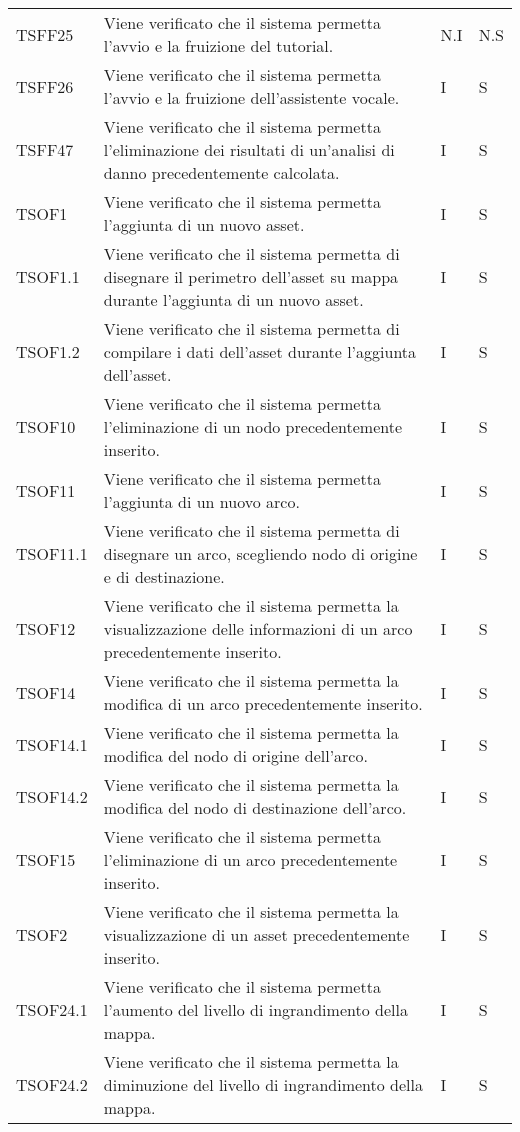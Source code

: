 \begin{longtable}{p{1.5cm}!{\VRule[1pt]}p{5cm}!{\VRule[1pt]}p{1cm}!{\VRule[1pt]}p{1cm}}
			TSFF25 & Viene verificato che il sistema permetta l'avvio e la fruizione del tutorial. & N.I & N.S \\ 
			TSFF26 & Viene verificato che il sistema permetta l'avvio e la fruizione dell'assistente vocale. & I & S \\ 
			TSFF47 & Viene verificato che il sistema permetta l'eliminazione dei risultati di un'analisi di danno precedentemente calcolata. & I & S \\ 
			TSOF1 & Viene verificato che il sistema permetta l'aggiunta di un nuovo asset. & I & S \\ 
			TSOF1.1 & Viene verificato che il sistema permetta di disegnare il perimetro dell'asset su mappa durante l'aggiunta di un nuovo asset. & I & S \\ 
			TSOF1.2 & Viene verificato che il sistema permetta di compilare i dati dell'asset durante l'aggiunta dell'asset. & I & S \\ 
			TSOF10 & Viene verificato che il sistema permetta l'eliminazione di un nodo precedentemente inserito. & I & S \\ 
			TSOF11 & Viene verificato che il sistema permetta l'aggiunta di un nuovo arco. & I & S \\ 
			TSOF11.1 & Viene verificato che il sistema permetta di disegnare un arco, scegliendo nodo di origine e di destinazione. & I & S \\ 
			TSOF12 & Viene verificato che il sistema permetta la visualizzazione delle informazioni di un arco precedentemente inserito. & I & S \\ 
			TSOF14 & Viene verificato che il sistema permetta la modifica di un arco precedentemente inserito. & I & S \\ 
			TSOF14.1 & Viene verificato che il sistema permetta la modifica del nodo di origine dell'arco. & I & S \\ 
			TSOF14.2 & Viene verificato che il sistema permetta la modifica del nodo di destinazione dell'arco. & I & S \\ 
			TSOF15 & Viene verificato che il sistema permetta l'eliminazione di un arco precedentemente inserito. & I & S \\ 
			TSOF2 & Viene verificato che il sistema permetta la visualizzazione di un asset precedentemente inserito. & I & S \\ 
			TSOF24.1 & Viene verificato che il sistema permetta l'aumento del livello di ingrandimento della mappa. & I & S \\ 
			TSOF24.2 & Viene verificato che il sistema permetta la diminuzione del livello di ingrandimento della mappa. & I & S \\ 

\end{longtable}
